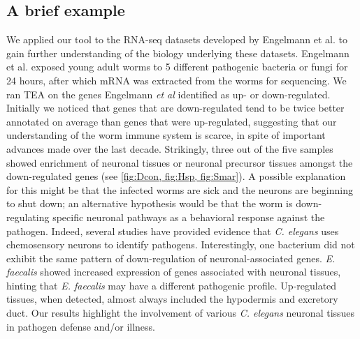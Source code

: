 \documentclass[linenumbers, doublespacing]{bmcart}
\begin{document}
\subsection*{A brief example}
We applied our tool to the RNA-seq datasets developed by Engelmann et al.  \cite{Engelmann2011} to gain further understanding of the biology underlying these datasets. Engelmann et al.  exposed young adult worms to 5 different pathogenic bacteria or fungi for 24 hours, after which mRNA was extracted from the worms for sequencing. We ran TEA on the genes Engelmann \emph{et al} identified as up- or down-regulated. Initially we noticed that genes that are down-regulated tend to be twice better annotated on average than genes that were up-regulated, suggesting that our understanding of the worm immune system is scarce, in spite of important advances made over the last decade. Strikingly, three out of the five samples showed enrichment of neuronal tissues or neuronal precursor tissues amongst the down-regulated genes (see \ref{fig:Dcon, fig:Hsp, fig:Smar}). A possible explanation for this might be that the infected worms are sick and the neurons are beginning to shut down; an alternative hypothesis would be that the worm is down-regulating specific neuronal pathways as a behavioral response against the pathogen. Indeed, several studies \cite{Meisel2014, Zhang2005} have provided evidence that   \emph{C. elegans} uses chemosensory neurons to identify pathogens. Interestingly, one bacterium did not exhibit the same pattern of down-regulation of neuronal-associated genes. \emph{E. faecalis} showed increased expression of genes associated with neuronal tissues, hinting that \emph{E. faecalis} may have a different pathogenic profile. Up-regulated tissues, when detected, almost always included the hypodermis and excretory duct.
	Our results highlight the involvement of various   \emph{C. elegans} neuronal tissues in pathogen defense and/or illness.
\end{document}
